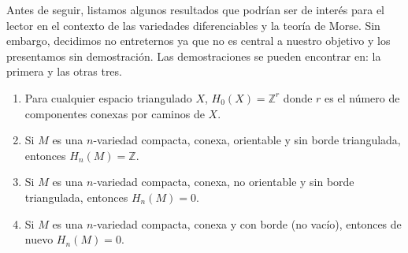 Antes de seguir, listamos algunos resultados que podrían ser de interés para el lector en el contexto de las variedades diferenciables y la teoría de Morse. Sin embargo, decidimos no entreternos ya que no es central a nuestro objetivo y los presentamos sin demostración. Las demostraciones se pueden encontrar en: \cite[p. ~87]{munoz2021} la primera y \cite[p.~97]{munoz2021} las otras tres.

\begin{enumerate}
    \item Para cualquier espacio triangulado $X$, $H_0(X)=\mathbb{Z}^r$ donde $r$ es el número de componentes conexas por caminos de $X$.
    \item Si $M$ es una $n$-variedad compacta, conexa, orientable y sin borde triangulada, entonces $H_n(M)=\mathbb{Z}$.
    \item Si $M$ es una $n$-variedad compacta, conexa, no orientable y sin borde triangulada, entonces $H_n(M)=0$.
    \item Si $M$ es una $n$-variedad compacta, conexa y con borde (no vacío), entonces de nuevo $H_n(M)=0$.
\end{enumerate}

 \bigskip

